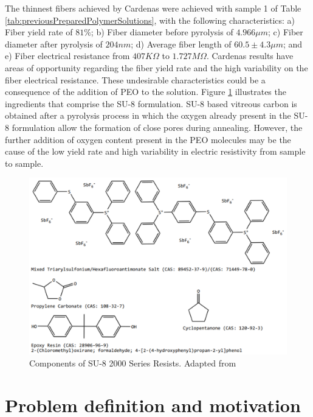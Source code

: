 The thinnest fibers achieved by Cardenas \cite{Cardenas2017} were achieved with sample 1 of Table \ref{tab:previousPreparedPolymerSolutions}, with the following characteristics: a) Fiber yield rate of $81\%$; b) Fiber diameter before pyrolysis of $4.966 \mu m$; c) Fiber diameter after pyrolysis of $204 nm$; d) Average fiber length of $60.5 ± 4.3 \mu m$; and e) Fiber electrical resistance from $407 K \Omega$ to $1.727 M \Omega$. Cardenas results have areas of opportunity regarding the fiber yield rate and the high variability on the fiber electrical resistance. These undesirable characteristics could be a consequence of the addition of PEO to the solution. Figure \ref{fig:su8Components} illustrates the ingredients that comprise the SU-8 formulation. SU-8 based vitreous carbon is obtained after a pyrolysis process in which the oxygen already present in the SU-8 formulation allow the formation of close pores during annealing. However, the further addition of oxygen content present in the PEO molecules may be the cause of the low yield rate and high variability in electric resistivity from sample to sample.

\begin{figure}[!th]
\centering
\includegraphics[scale=0.50]{./Figures/su8Components.png}
\decoRule
\caption[Components of SU-8 2000 Series Resists]{Components of SU-8 2000 Series Resists. Adapted from \cite{Microchem2012}}
\label{fig:su8Components}
\end{figure}

\section{Problem definition and motivation}

